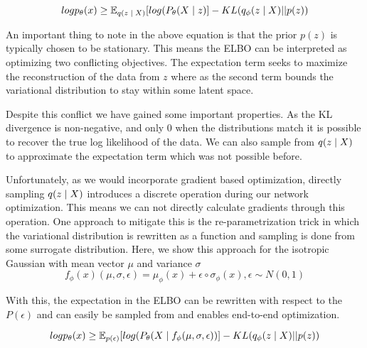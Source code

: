 \begin{equation}
	log p_{\theta}(x) \geq \operatorname{\mathbb{E}}_{q(z \; | \;{X})} [ log(P_{\theta}(X \; | \;{z}) ]  - KL(q_{\phi}(z \; | \;{X}) || p(z))
\end{equation}

An important thing to note in the above equation is that the prior $p(z)$ is typically chosen to be stationary. This means the \ac{ELBO} can be interpreted as optimizing two conflicting objectives. The expectation term seeks to maximize the reconstruction of the data from $z$ where as the second term bounds the variational distribution to stay within some latent space.

Despite this conflict we have gained some important properties. As the KL divergence is non-negative, and only 0 when the distributions match it is possible to recover the true log likelihood of the data. We can also sample from $q(z \; | \;{X})$ to approximate the expectation term which was not possible before.

Unfortunately, as we would incorporate gradient based optimization, directly sampling $q(z \; | \;{X})$ introduces a discrete operation during our network optimization. This means we can not directly calculate gradients through this operation. One approach to mitigate this is the re-parametrization trick \cite{kingma2014autoencodingVB,rezende2014stochasticBackprop} in which the variational distribution  is rewritten as a function and sampling is done from some surrogate distribution. Here, we show this approach for the isotropic Gaussian with mean vector $\mu$ and variance $\sigma$
\begin{equation}
f_{\phi}(x)(\mu, \sigma, \epsilon) = \mu_{\phi}(x) + \epsilon \circ \sigma_{\phi}(x), \epsilon \sim N(0, 1)
\end{equation}

With this, the expectation in the \ac{ELBO} can be rewritten with respect to the $P(\epsilon)$ and can easily be sampled from and enables end-to-end optimization. 

\begin{equation}
log p_{\theta}(x) \geq \operatorname{\mathbb{E}}_{p(\epsilon) } [ log(P_{\theta}(X \; | \;{f_{\phi}(\mu, \sigma, \epsilon)}) ]  - KL(q_{\phi}(z \; | \;{X}) || p(z))
\end{equation}






